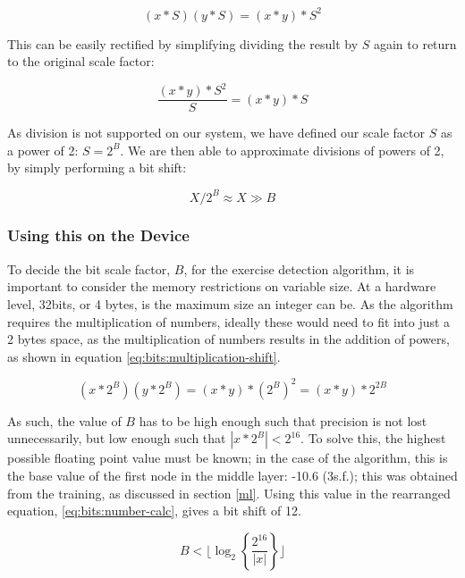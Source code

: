 \begin{equation}
\label{eq:bits:multiplication}
(x*S)(y*S)=(x*y)*S^2
\end{equation}

This can be easily rectified by simplifying dividing the result by $S$ again to return to the original scale factor:

\begin{equation}
\label{eq:bits:rescale}
\frac{(x*y)*S^2}{S}=(x*y)*S
\end{equation}

As division is not supported on our system, we have defined our scale factor $S$ as a power of 2: $S=2^B$. We are then able to approximate divisions of powers of 2, by simply performing a bit shift:

\begin{equation}
\label{eq:bits:div_approx}
X/2^B\approx X \gg B
\end{equation}

\subsubsection{Using this on the Device}

To decide the bit scale factor, $B$, for the exercise detection algorithm, it is important to consider the memory restrictions on variable size. At a hardware level, 32bits, or 4 bytes, is the maximum size an integer can be. As the algorithm requires the multiplication of numbers, ideally these would need to fit into just a 2 bytes space, as the multiplication of numbers results in the addition of powers, as shown in equation \ref{eq:bits:multiplication-shift}.

\begin{equation}
\label{eq:bits:multiplication-shift}
(x*2^B)(y*2^B)=(x*y)*(2^B)^2=(x*y)*2^{2B}
\end{equation}

As such, the value of $B$ has to be high enough such that precision is not lost unnecessarily, but low enough such that $|x*2^B|<2^{16}$. To solve this, the highest possible floating point value must be known; in the case of the algorithm, this is the base value of the first node in the middle layer: -10.6 (3s.f.); this was obtained from the training, as discussed in section \ref{ml}. Using this value in the rearranged equation, \ref{eq:bits:number-calc}, gives a bit shift of 12.

\begin{equation}
\label{eq:bits:number-calc}
B<\lfloor\log_{2}\left\{\frac{2^{16}}{|x|}\right\}\rfloor
\end{equation}
